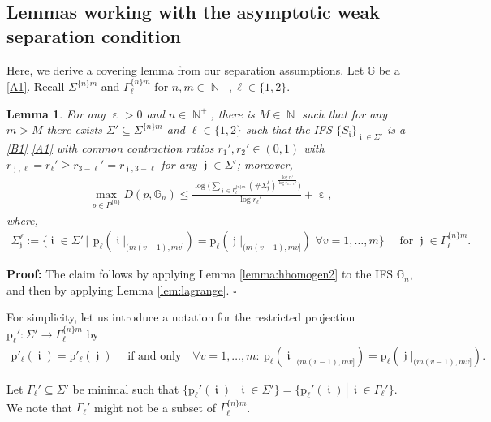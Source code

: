 \documentclass[a4paper, 11pt]{article}
\newenvironment{Proof}{\noindent \textbf{Proof:}}{\hfill$\square$\\}
\DeclareMathOperator{\N}{\mathbb{N}}
\DeclareMathOperator{\iii}{\mathfrak{i}}
\DeclareMathOperator{\jjj}{\mathfrak{j}}
\DeclareMathOperator{\eps}{\varepsilon}
\numberwithin{equation}{section}
\theoremstyle{plain}
\newtheorem{lemma}[theorem]{Lemma}
\theoremstyle{remark}
\theoremstyle{definition}
\begin{document}
\subsection{Lemmas working with the asymptotic weak separation condition}
Here, we derive a covering lemma from our separation assumptions. Let $\mathbb{G}$ be a \ref{A1}. Recall $\Sigma^{\{n\}m}$ and $\Gamma_\ell^{\{n\}m}$ for $n,m \in \N^+, \ell \in \{1,2\}$.

\begin{lemma}\label{lemma:symbolichomogene}
For any $\eps > 0$ and $n \in \N^+$, there is $M \in \N$ such that for any $m>M$ there exists $\Sigma' \subseteq \Sigma^{\{n\}m}$ and $\ell \in \{1,2\}$ such that
the IFS $\{S_{\iii}\}_{\iii \in \Sigma'}$ is a \ref{B1} \ref{A1} with common contraction ratios $r_1',r_2' \in (0,1)$ with $r_{\jjj,\ell} = r_\ell' \geq r_{3-\ell}' = r_{\jjj,3-\ell}$ for any $\jjj\in\Sigma'$; moreover,
\begin{align*}
\max_{p \in P^{\{n\}}}D(p,\mathbb{G}_n) \leq \frac{\log \bigg(\sum\limits_{\jjj\in\Gamma_{\ell}^{\{n\}m}}(\#\Sigma_{\jjj}^\ell )^{\frac{\log r_\ell'}{\log r_{3-\ell}'}}\bigg)}{-\log r_\ell'} + \eps, 
\end{align*}
where,  
\begin{align} \label{eq:projrow}
\Sigma_{\jjj}^\ell := \big\{\iii \in \Sigma' \, \big|\, \ \mathrm{p}_{\ell} (\iii |_{(m(v-1),mv]})= \mathrm{p}_{\ell} (\jjj |_{(m(v-1),mv]})\,\, \forall v = 1,\dots,m\big\}\quad\text{ for $\jjj \in \Gamma_\ell^{\{n\}m}$}.
\end{align}
\end{lemma}

\begin{Proof}
The claim follows by applying Lemma \ref{lemma:hhomogen2} to the IFS $\mathbb{G}_n$, and then by applying Lemma \ref{lem:lagrange}.
\end{Proof}

For simplicity, let us introduce a notation for the restricted projection $\mathrm{p}_\ell'\colon\Sigma'\to\Gamma_\ell^{\{n\}m}$ by
\begin{align*}
\mathrm{p}'_\ell(\iii) = \mathrm{p}'_\ell(\jjj) \quad \text{ if and only} \quad \forall v = 1,\dots,m: \ \mathrm{p}_{\ell} (\iii |_{(m(v-1),mv]})= \mathrm{p}_{\ell} (\jjj |_{(m(v-1),mv]}).
\end{align*}

Let $\Gamma_\ell' \subseteq \Sigma'$ be minimal such that $\{\mathrm{p}_\ell'(\iii) \, | \, \iii \in \Sigma'\} = \{\mathrm{p}_\ell'(\iii) \, | \, \iii \in \Gamma_\ell'\}.$ We note that $\Gamma_\ell'$ might not be a subset of $\Gamma_\ell^{\{n\}m}$.
\end{document}

